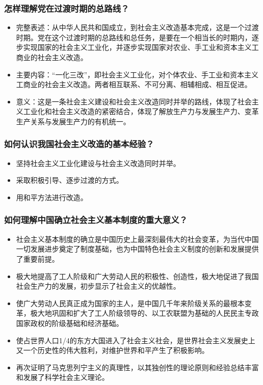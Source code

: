 \documentclass{article}
\begin{document}
\subsubsection{怎样理解党在过渡时期的总路线？}
\begin{itemize}
    \item 完整表述：从中华人民共和国成立，到社会主义改造基本完成，这是一个过渡时期。党在这个过渡时期的总路线和总任务，是要在一个相当长的时期内，逐步实现国家的社会主义工业化，并逐步实现国家对农业、手工业和资本主义工商业的社会主义改造。
    \item 主要内容：“一化三改”，即社会主义工业化，对个体农业、手工业和资本主义工商业的社会主义改造。两者相互联系、不可分离、相辅相成、相互促进。
    \item 意义：这是一条社会主义建设和社会主义改造同时并举的路线，体现了社会主义工业化和社会主义改造的紧密结合，体现了解放生产力与发展生产力、变革生产关系与发展生产力的有机统一。
\end{itemize}

\subsubsection{如何认识我国社会主义改造的基本经验？}
\begin{itemize}
    \item 坚持社会主义工业化建设与社会主义改造同时并举。
    \item 采取积极引导、逐步过渡的方式。
    \item 用和平方法进行改造。
\end{itemize}

\subsubsection{如何理解中国确立社会主义基本制度的重大意义？}
\begin{itemize}
    \item 社会主义基本制度的确立是中国历史上最深刻最伟大的社会变革，为当代中国一切发展进步奠定了制度基础，也为中国特色社会主义制度的创新和发展提供了重要前提。
    \item 极大地提高了工人阶级和广大劳动人民的积极性、创造性，极大地促进了我国社会生产力的发展，初步显示了社会主义的优越性。
    \item 使广大劳动人民真正成为国家的主人，是中国几千年来阶级关系的最根本变革，极大地巩固和扩大了工人阶级领导的、以工农联盟为基础的人民民主专政国家政权的阶级基础和经济基础。
    \item 使占世界人口1/4的东方大国进入了社会主义社会，是世界社会主义发展史上又一个历史性的伟大胜利，对维护世界和平产生了积极影响。
    \item 再次证明了马克思列宁主义的真理性，以其独创性的理论原则和经验总结丰富和发展了科学社会主义理论。
\end{itemize}
\end{document}
